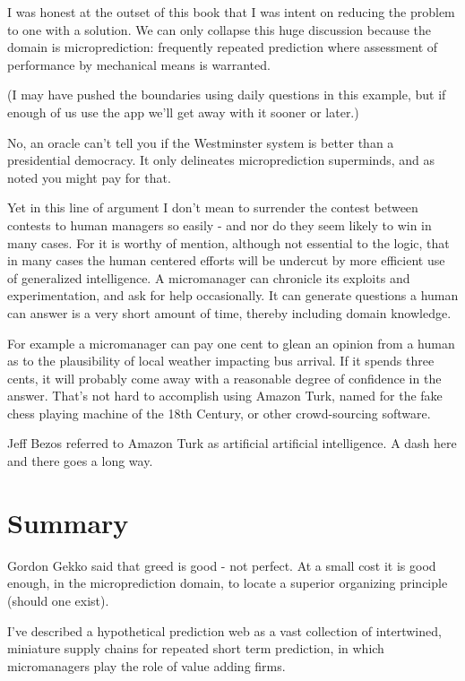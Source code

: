 I was honest at the outset of this book that I was intent on reducing the problem to one with a solution. We can only collapse this huge discussion because the domain is microprediction: frequently repeated prediction where assessment of performance by mechanical means is warranted. 

(I may have pushed the boundaries using daily questions in this example, but if enough of us use the app we'll get away with it sooner or later.) 

No, an oracle can't tell you if the Westminster system is better than a presidential democracy. It only delineates microprediction superminds, and as noted you might pay for that.  

Yet in this line of argument I don't mean to surrender the contest between contests to human managers so easily - and nor do they seem likely to win in many cases.   
For it is worthy of mention, although not essential to the logic, that in many cases the human centered efforts will be undercut by more efficient use of generalized intelligence. A micromanager can chronicle its exploits and experimentation, and ask for help occasionally. It can generate questions a human can answer is a very short amount of time, thereby including domain knowledge. 

For example a micromanager can pay one cent to glean an opinion from a human as to the plausibility of local weather impacting bus arrival. If it spends three cents, it will probably come away with a reasonable degree of confidence in the answer. That's not hard to accomplish using Amazon Turk, named for the fake chess playing machine of the 18th Century, or other crowd-sourcing software.  

Jeff Bezos referred to Amazon Turk as artificial artificial intelligence. A dash here and there goes a long way.  




\section{Summary}


Gordon Gekko said that greed is good - not perfect. At a small cost it is good enough, in the microprediction domain, to locate a superior organizing principle (should one exist). 

I've described a hypothetical prediction web as a vast collection of intertwined, miniature supply chains for repeated short term prediction, in which micromanagers play the role of value adding firms. 


